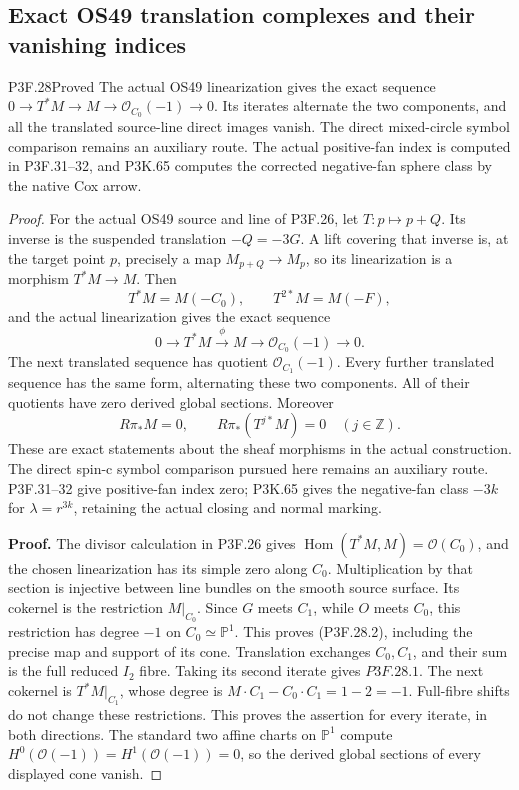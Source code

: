 \subsection{Exact OS49 translation complexes and their vanishing indices}
\begin{statement}{P3F.28}{Proved}
The actual OS49 linearization gives the exact sequence $0\to T^*M\to M\to\mathcal O_{C_0}(-1)\to0$. Its iterates alternate the two components, and all the translated source-line direct images vanish. The direct mixed-circle symbol comparison remains an auxiliary route. The actual positive-fan index is computed in P3F.31--32, and P3K.65 computes the corrected negative-fan sphere class by the native Cox arrow.
\end{statement}
\begin{proof}
For the actual OS49 source and line of P3F.26, let \(T:p\mapsto p+Q\). Its inverse is the suspended translation \(-Q=-3G\). A lift covering that inverse is, at the target point \(p\), precisely a map \(M_{p+Q}\to M_p\), so its linearization is a morphism \(T^*M\to M\). Then \[
 T^*M=M(-C_0),\qquad T^{2*}M=M(-F),
                                                        \tag{P3F.28.1}
\] and the actual linearization gives the exact sequence \[
 0\longrightarrow T^*M\xrightarrow{\phi}M
       \longrightarrow\mathcal O_{C_0}(-1)
       \longrightarrow0.                              \tag{P3F.28.2}
\] The next translated sequence has quotient \(\mathcal O_{C_1}(-1)\). Every further translated sequence has the same form, alternating these two components. All of their quotients have zero derived global sections. Moreover \[
 R\pi_*M=0,
 \qquad R\pi_*(T^{j*}M)=0\quad(j\in\mathbb Z).          \tag{P3F.28.3}
\] These are exact statements about the sheaf morphisms in the actual construction. The direct spin-c symbol comparison pursued here remains an auxiliary route. P3F.31--32 give positive-fan index zero; P3K.65 gives the negative-fan class \(-3k\) for \(\lambda=r^{3k}\), retaining the actual closing and normal marking.

\textbf{Proof.} The divisor calculation in P3F.26 gives \(\operatorname{Hom}(T^*M,M)=\mathcal O(C_0)\), and the chosen linearization has its simple zero along \(C_0\). Multiplication by that section is injective between line bundles on the smooth source surface. Its cokernel is the restriction \(M|_{C_0}\). Since \(G\) meets \(C_1\), while \(O\) meets \(C_0\), this restriction has degree \(-1\) on \(C_0\simeq\mathbb P^1\). This proves (P3F.28.2), including the precise map and support of its cone. Translation exchanges \(C_0,C_1\), and their sum is the full reduced \(I_2\) fibre. Taking its second iterate gives \(P3F.28.1\). The next cokernel is \(T^*M|_{C_1}\), whose degree is \(M\cdot C_1-C_0\cdot C_1=1-2=-1\). Full-fibre shifts do not change these restrictions. This proves the assertion for every iterate, in both directions. The standard two affine charts on \(\mathbb P^1\) compute \(H^0(\mathcal O(-1))=H^1(\mathcal O(-1))=0\), so the derived global sections of every displayed cone vanish.


\end{proof}
